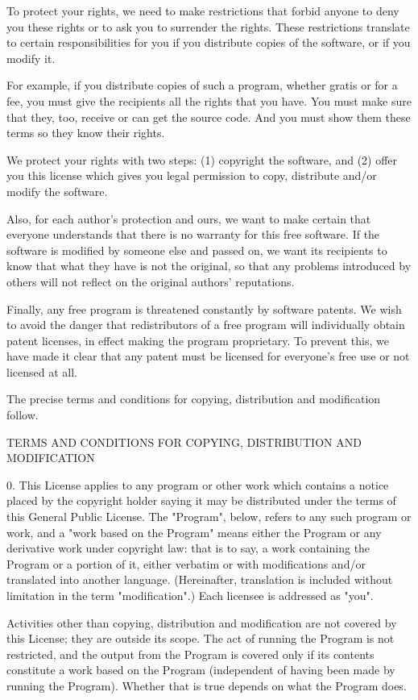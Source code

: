 To protect your rights, we need to make restrictions that forbid anyone to deny you these rights or to ask you to surrender the rights. These restrictions translate to certain responsibilities for you if you distribute copies of the software, or if you modify it.

For example, if you distribute copies of such a program, whether gratis or for a fee, you must give the recipients all the rights that you have. You must make sure that they, too, receive or can get the source code. And you must show them these terms so they know their rights.

We protect your rights with two steps: (1) copyright the software, and (2) offer you this license which gives you legal permission to copy, distribute and/or modify the software.

Also, for each author's protection and ours, we want to make certain that everyone understands that there is no warranty for this free software. If the software is modified by someone else and passed on, we want its recipients to know that what they have is not the original, so that any problems introduced by others will not reflect on the original authors' reputations.

Finally, any free program is threatened constantly by software patents. We wish to avoid the danger that redistributors of a free program will individually obtain patent licenses, in effect making the program proprietary. To prevent this, we have made it clear that any patent must be licensed for everyone's free use or not licensed at all.

The precise terms and conditions for copying, distribution and modification follow.

TERMS AND CONDITIONS FOR COPYING, DISTRIBUTION AND MODIFICATION

0. This License applies to any program or other work which contains a notice placed by the copyright holder saying it may be distributed under the terms of this General Public License. The "Program", below, refers to any such program or work, and a "work based on the Program" means either the Program or any derivative work under copyright law: that is to say, a work containing the Program or a portion of it, either verbatim or with modifications and/or translated into another language. (Hereinafter, translation is included without limitation in the term "modification".) Each licensee is addressed as "you".

Activities other than copying, distribution and modification are not covered by this License; they are outside its scope. The act of running the Program is not restricted, and the output from the Program is covered only if its contents constitute a work based on the Program (independent of having been made by running the Program). Whether that is true depends on what the Program does.

